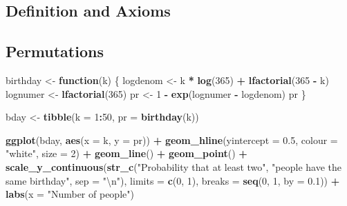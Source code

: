 \documentclass[]{book}
\newenvironment{Shaded}{\begin{snugshade}}{\end{snugshade}}
\newcommand{\CharTok}[1]{\textcolor[rgb]{0.31,0.60,0.02}{#1}}
\newcommand{\ControlFlowTok}[1]{\textcolor[rgb]{0.13,0.29,0.53}{\textbf{#1}}}
\newcommand{\DataTypeTok}[1]{\textcolor[rgb]{0.13,0.29,0.53}{#1}}
\newcommand{\DecValTok}[1]{\textcolor[rgb]{0.00,0.00,0.81}{#1}}
\newcommand{\FloatTok}[1]{\textcolor[rgb]{0.00,0.00,0.81}{#1}}
\newcommand{\KeywordTok}[1]{\textcolor[rgb]{0.13,0.29,0.53}{\textbf{#1}}}
\newcommand{\NormalTok}[1]{#1}
\newcommand{\OperatorTok}[1]{\textcolor[rgb]{0.81,0.36,0.00}{\textbf{#1}}}
\newcommand{\StringTok}[1]{\textcolor[rgb]{0.31,0.60,0.02}{#1}}
\theoremstyle{definition}
\theoremstyle{definition}
\theoremstyle{definition}
\theoremstyle{remark}
\begin{document}
\hypertarget{definition-and-axioms}{%
\subsection{Definition and Axioms}\label{definition-and-axioms}}

\hypertarget{permutations}{%
\subsection{Permutations}\label{permutations}}

\begin{Shaded}
\begin{Highlighting}[]
\NormalTok{birthday <-}\StringTok{ }\ControlFlowTok{function}\NormalTok{(k) \{}
\NormalTok{  logdenom <-}\StringTok{ }\NormalTok{k }\OperatorTok{*}\StringTok{ }\KeywordTok{log}\NormalTok{(}\DecValTok{365}\NormalTok{) }\OperatorTok{+}\StringTok{ }\KeywordTok{lfactorial}\NormalTok{(}\DecValTok{365} \OperatorTok{-}\StringTok{ }\NormalTok{k)}
\NormalTok{  lognumer <-}\StringTok{ }\KeywordTok{lfactorial}\NormalTok{(}\DecValTok{365}\NormalTok{)}
\NormalTok{  pr <-}\StringTok{ }\DecValTok{1} \OperatorTok{-}\StringTok{   }\KeywordTok{exp}\NormalTok{(lognumer }\OperatorTok{-}\StringTok{ }\NormalTok{logdenom)}
\NormalTok{  pr}
\NormalTok{\}}

\NormalTok{bday <-}\StringTok{ }\KeywordTok{tibble}\NormalTok{(}\DataTypeTok{k =} \DecValTok{1}\OperatorTok{:}\DecValTok{50}\NormalTok{, }\DataTypeTok{pr =} \KeywordTok{birthday}\NormalTok{(k))}
               
\KeywordTok{ggplot}\NormalTok{(bday, }\KeywordTok{aes}\NormalTok{(}\DataTypeTok{x =}\NormalTok{ k, }\DataTypeTok{y =}\NormalTok{ pr)) }\OperatorTok{+}
\StringTok{  }\KeywordTok{geom_hline}\NormalTok{(}\DataTypeTok{yintercept =} \FloatTok{0.5}\NormalTok{, }\DataTypeTok{colour =} \StringTok{"white"}\NormalTok{, }\DataTypeTok{size =} \DecValTok{2}\NormalTok{) }\OperatorTok{+}
\StringTok{  }\KeywordTok{geom_line}\NormalTok{() }\OperatorTok{+}
\StringTok{  }\KeywordTok{geom_point}\NormalTok{() }\OperatorTok{+}
\StringTok{  }\KeywordTok{scale_y_continuous}\NormalTok{(}\KeywordTok{str_c}\NormalTok{(}\StringTok{"Probability that at least two"}\NormalTok{,}
                           \StringTok{"people have the same birthday"}\NormalTok{, }\DataTypeTok{sep =} \StringTok{"}\CharTok{\textbackslash{}n}\StringTok{"}\NormalTok{),}
                     \DataTypeTok{limits =} \KeywordTok{c}\NormalTok{(}\DecValTok{0}\NormalTok{, }\DecValTok{1}\NormalTok{), }\DataTypeTok{breaks =} \KeywordTok{seq}\NormalTok{(}\DecValTok{0}\NormalTok{, }\DecValTok{1}\NormalTok{, }\DataTypeTok{by =} \FloatTok{0.1}\NormalTok{)) }\OperatorTok{+}
\StringTok{  }\KeywordTok{labs}\NormalTok{(}\DataTypeTok{x =} \StringTok{"Number of people"}\NormalTok{)}
\end{Highlighting}
\end{Shaded}
\end{document}
